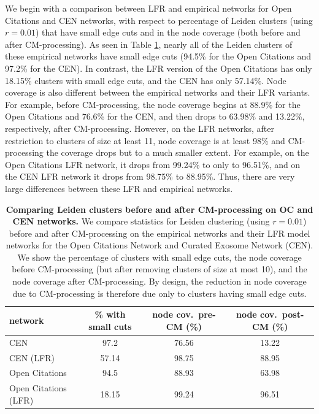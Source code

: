 \documentclass[11pt]{article}   	%
\begin{document}
We begin with a comparison  between LFR and empirical networks for Open Citations and CEN networks, with respect to percentage of  Leiden clusters (using $r=0.01$) that have small edge cuts and in
the node coverage (both before and after CM-processing).   As seen in
Table \ref{tab:LFR-vs-empirical-OC-CEN}, nearly all of the Leiden clusters of these empirical networks have small edge cuts (94.5\% for the Open Citations and 97.2\% for the CEN).
In contrast,  the LFR version of the Open Citations has only 18.15\% clusters with small edge cuts, and the CEN has only 57.14\%.  
Node coverage is also different between the empirical networks and their LFR variants.
For example, before CM-processing, the node coverage begins at 88.9\% for the Open Citations and 76.6\% for the CEN, and then drops to 63.98\% and 13.22\%, respectively, after CM-processing. 
However, on the LFR networks, after restriction to clusters of size at least 11, node coverage is at least 98\%  and CM-processing the coverage drops but to a much smaller
extent. For example, on the Open Citations LFR network, it drops from 99.24\% to only to 96.51\%, and on the CEN LFR network it drops from 98.75\% to 88.95\%.
Thus, there are very large differences between these LFR and empirical networks.

\begin{table}[ht]
\centering
\begin{tabular}{lccc}
  \hline
 network & \% with small cuts & node cov.~pre-CM (\%) & node cov.~post-CM (\%) \\
   \hline
   CEN  &97.2 &76.56 &13.22 \\
   CEN (LFR) & 57.14& 98.75 & 88.95\\
   \hline
   Open Citations  &94.5&88.93&63.98 \\
   Open Citations (LFR) &18.15&99.24&96.51\\
   \hline
\end{tabular}
\caption{\textbf{Comparing Leiden clusters before and after CM-processing  on   OC and CEN networks.} We compare statistics for Leiden clustering (using $r=0.01$) before and after CM-processing on the empirical networks and their LFR model
networks for the Open Citations Network and Curated Exosome Network (CEN). We show the percentage of clusters with small edge cuts, the node coverage before CM-processing (but after removing clusters of size at most 10), and the node coverage after CM-processing.  By design, the reduction in node coverage due to CM-processing  is therefore due only to clusters having small edge cuts.}
\label{tab:LFR-vs-empirical-OC-CEN}
\end{table}
\end{document}

